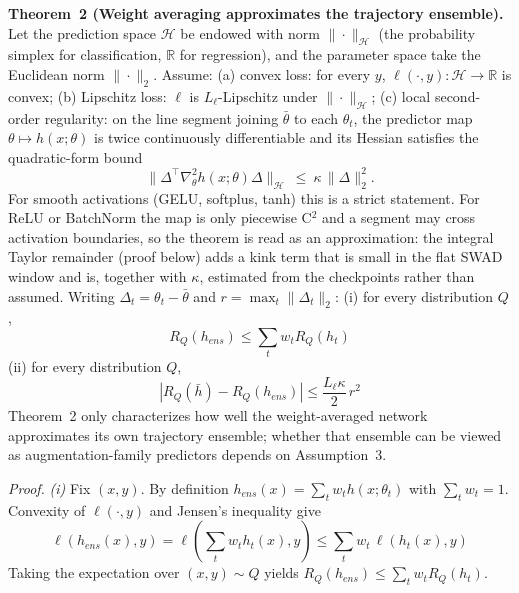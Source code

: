 \documentclass[electronics,article,submit,moreauthors]{Definitions/mdpi}
\begin{document}
\noindent\textbf{Theorem~2 (Weight averaging approximates the trajectory ensemble).} Let the prediction space $\mathcal{H}$ be endowed with norm $\|\cdot\|_{\mathcal{H}}$ (the probability simplex for classification, $\mathbb{R}$ for regression), and the parameter space take the Euclidean norm $\|\cdot\|_2$. Assume:
(a) convex loss: for every $y$, $\ell(\cdot,y):\mathcal{H}\to\mathbb{R}$ is convex;
(b) Lipschitz loss: $\ell$ is $L_{\ell}$-Lipschitz under $\|\cdot\|_{\mathcal{H}}$;
(c) local second-order regularity: on the line segment joining $\bar\theta$ to each $\theta_t$, the predictor map $\theta\mapsto h(x;\theta)$ is twice continuously differentiable and its Hessian satisfies the quadratic-form bound
\begin{equation}
\|\Delta^{\top}\nabla_{\theta}^{2}h(x;\theta)\Delta\|_{\mathcal{H}}\ \leq\ \kappa\,\|\Delta\|_{2}^{2}.
\end{equation}
For smooth activations (GELU, softplus, tanh) this is a strict statement. For ReLU or BatchNorm the map is only piecewise C$^2$ and a segment may cross activation boundaries, so the theorem is read as an approximation: the integral Taylor remainder (proof below) adds a kink term that is small in the flat SWAD window and is, together with $\kappa$, estimated from the checkpoints rather than assumed.
Writing $\Delta_t=\theta_t-\bar\theta$ and $r=\max_t\|\Delta_t\|_2$:
(i) for every distribution $Q$,
\begin{equation}
R_Q(h_{ens})\leq\sum_t w_t R_Q(h_t)
\end{equation}
(ii) for every distribution $Q$,
\begin{equation}
\left|R_Q(\bar h)-R_Q(h_{ens})\right|\leq\frac{L_{\ell}\kappa}{2}\,r^{2}
\end{equation}
Theorem~2 only characterizes how well the weight-averaged network approximates its own trajectory ensemble; whether that ensemble can be viewed as augmentation-family predictors depends on Assumption~3.

\noindent\textit{Proof.}
\emph{(i)} Fix $(x,y)$. By definition $h_{ens}(x)=\sum_t w_t h(x;\theta_t)$ with $\sum_t w_t=1$. Convexity of $\ell(\cdot,y)$ and Jensen's inequality give
\begin{equation}
\ell(h_{ens}(x),y)=\ell\!\left(\sum_t w_t h_t(x),y\right)\leq\sum_t w_t\,\ell(h_t(x),y)
\end{equation}
Taking the expectation over $(x,y)\sim Q$ yields $R_Q(h_{ens})\leq\sum_t w_t R_Q(h_t)$.
\end{document}
